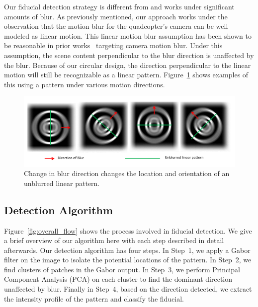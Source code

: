\documentclass[10pt,twocolumn,letterpaper]{article}
\begin{document}
Our fiducial detection strategy is different from
\cite{NaimarkF02,Pitag13} and works under significant amounts of blur.
As previously mentioned, our approach works under the observation that
the motion blur for the quadcopter's camera can be well modeled as
linear motion.  This linear motion blur assumption has been shown to
be reasonable in prior works~\cite{Moshe:2003,Moshe:2004}
targeting camera motion blur. Under this assumption, the scene
content perpendicular to the blur direction is unaffected by the blur.
Because of our circular design, the direction perpendicular to the
linear motion will still be recognizable as a linear pattern.
Figure~\ref{fig:blur_direction} shows examples of this using a pattern
under 
various motion directions.

\begin{figure}[h!]
\centering
\includegraphics[width=\linewidth]{images/blur_direction}
\caption{Change in blur direction changes the location and orientation
  of an unblurred linear pattern.}
\label{fig:blur_direction}
\end{figure}


\subsection{Detection Algorithm}

Figure~\ref{fig:overall_flow} shows the process involved in fiducial
detection. We give a brief overview of our algorithm here with each
step described in detail afterwards.  Our detection algorithm has four
steps. In Step~1, we apply a Gabor filter on the image to isolate the
potential locations of the pattern.  In Step~2, we find clusters of
patches in the Gabor output.  In Step~3, we perform Principal
Component Analysis (PCA) on each cluster to find the dominant
direction unaffected by blur.  Finally in Step~4, based on the
direction detected, we extract the intensity profile of the pattern
and classify the fiducial. 
\end{document}
